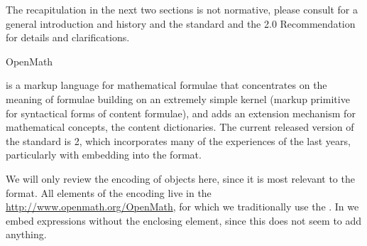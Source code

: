 \begin{omgroup}[id=mobj,short=Mathematical Objects]
The recapitulation in the next two sections is not normative, please consult
{} for a general introduction and history and the {\openmath}
standard and the {\mathml} 2.0 Recommendation for details and clarifications.

\begin{omgroup}[id=openmath]{OpenMath}
\begin{module}[id=OpenMath]

{\openmath} is a markup language for mathematical formulae that concentrates on the
meaning of formulae building on an extremely simple kernel (markup primitive for
syntactical forms of content formulae), and adds an extension mechanism for mathematical
concepts, the content dictionaries.   The current released version of the
{\openmath} standard is {\openmath}2, which incorporates many of the experiences of the
last years, particularly with embedding {\openmath} into the {\omdoc}
format.

We will only review the {\xml} encoding of {\openmath} objects here, since it is most
relevant to the {\omdoc} format. All elements of the {\xml} encoding live in the
{} \url{http://www.openmath.org/OpenMath}, for
which we traditionally use the {}
. In {\omdoc} we embed {\openmath}
expressions without the enclosing {} element, since this does
not seem to add anything.


\end{module}
\end{omgroup}
\end{omgroup}
